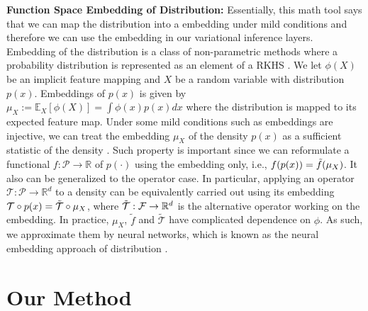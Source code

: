 \documentclass[11pt,a4paper]{article}
\theoremstyle{definition}
\begin{document}
\textbf{Function Space Embedding of Distribution:}
Essentially, this math tool says that we can map the distribution into a embedding under mild conditions and therefore we can use the embedding in our variational inference layers. 
Embedding of the distribution is a class of non-parametric methods where a probability distribution is represented as an element of a RKHS \citep{smola2007hilbert}. We let $\phi(X)$ be an implicit feature mapping  and $X$ be a random variable with distribution $p(x)$.
Embeddings of $p(x)$  is given by
$\mu_X:= \mathbb{E}_X [\phi(X)]=\int \phi(x)p(x)dx $
where the distribution is mapped to its expected feature map. Under some mild conditions such as embeddings are injective, we can treat the embedding $\mu_X$ of the density $p(x)$ as a sufficient statistic of the density \citep{dai2016discriminative}.  Such property is important since we can reformulate a functional $f:\mathcal{P}\rightarrow \mathbb{R}$ of $p(\cdot)$ using the embedding only, i.e., $f(p(x))=\Tilde{f}(\mu_X)$. It also can be generalized to the operator case. In particular, applying an operator $\mathcal{T}: \mathcal{P}\rightarrow \mathbb{R}^d $ to a density can be equivalently carried out using its embedding $\mathcal{T}\circ p(x)= \Tilde{\mathcal{T}} \circ \mu_X$, where $ \Tilde{\mathcal{T}}: \mathcal{F} \rightarrow \mathbb{R}^d$ is the alternative operator working on the embedding. In practice, $\mu_X$, $\tilde{f}$ and $\tilde{\mathcal{T}}$ have complicated dependence on $\phi$. As such, we  approximate them by neural networks, which is known as the neural embedding approach of distribution \citep{dai2016discriminative}. 


\section{Our Method}\label{section:our_method}
\end{document}
